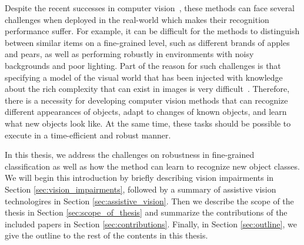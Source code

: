 Despite the recent successes in computer vision~\cite{he2016deep, redmon2017yolo9000, xu2015show}, these methods can face several challenges when deployed in the real-world which makes their recognition performance suffer. For example, it can be difficult for the methods to distinguish between similar items on a fine-grained level, such as different brands of apples and pears, as well as performing robustly in environments with noisy backgrounds and poor lighting. 
Part of the reason for such challenges is that specifying a model of the visual world that has been injected with knowledge about the rich complexity that can exist in images is very difficult~\cite{szeliski2010computer}. Therefore, there is a necessity for developing computer vision methods that can recognize different appearances of objects, adapt to changes of known objects, and learn what new objects look like. At the same time, these tasks should be possible to execute in a time-efficient and robust manner. 

In this thesis, we address the challenges on robustness in fine-grained classification as well as how the method can learn to recognize new object classes. We will begin this introduction by briefly describing vision impairments in Section \ref{sec:vision_impairments}, followed by a summary of assistive vision technologires in Section \ref{sec:assistive_vision}. Then we describe the scope of the thesis in Section \ref{sec:scope_of_thesis} and summarize the contributions of the included papers in Section \ref{sec:contributions}. Finally, in Section \ref{sec:outline}, we give the outline to the rest of the contents in this thesis. 



